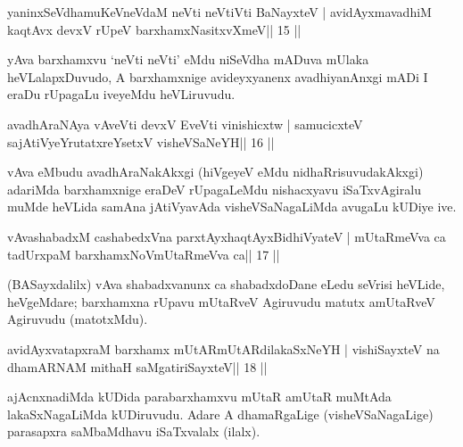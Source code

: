 

\begin{shl}
yaninxSeVdhamuKeVneVdaM neVti neVtiVti BaNayxteV |
avidAyxmavadhiM kaqtAvx devxV rUpeV barxhamxNasitxvXmeV\hfill || 15 ||
\end{shl}

\begin{artha}
yAva barxhamxvu `neVti neVti' eMdu niSeVdha mADuva mUlaka heVLalapxDuvudo, A barxhamxnige avideyxyanenx avadhiyanAnxgi mADi I eraDu rUpagaLu iveyeMdu heVLiruvudu.
\end{artha}



\begin{shl}
avadhAraNAya vAveVti devxV EveVti vinishicxtw |
samucicxteV sajAtiVyeYrutatxreYsetxV visheVSaNeYH\hfill || 16 ||
\end{shl}

\begin{artha}
vAva eMbudu avadhAraNakAkxgi (hiVgeyeV eMdu nidhaRrisuvudakAkxgi) adariMda barxhamxnige eraDeV rUpagaLeMdu nishacxyavu iSaTxvAgiralu muMde heVLida samAna jAtiVyavAda visheVSaNagaLiMda avugaLu kUDiye ive.
\end{artha}

\begin{shl}
vAvashabadxM cashabedxVna parxtAyxhaqtAyxBidhiVyateV |
mUtaRmeVva ca tadUrxpaM barxhamxNoV\s mUtaRmeVva ca\hfill || 17 ||
\end{shl}

\begin{artha}
(BASayxdalilx) vAva shabadxvanunx ca shabadxdoDane eLedu seVrisi heVLide, heVgeMdare; barxhamxna rUpavu mUtaRveV Agiruvudu matutx amUtaRveV Agiruvudu (matotxMdu).
\end{artha}

\begin{shl}
avidAyxvatapxraM barxhamx mUtARmUtARdilakaSxNeYH |
vishiSayxteV na dhamARNAM mithaH saMgatiriSayxteV\hfill || 18 ||
\end{shl}

\begin{artha}
ajAcnxnadiMda kUDida parabarxhamxvu mUtaR amUtaR muMtAda
lakaSxNagaLiMda kUDiruvudu. Adare A dhamaRgaLige (visheVSaNagaLige)
parasapxra saMbaMdhavu iSaTxvalalx (ilalx). 
\end{artha}



